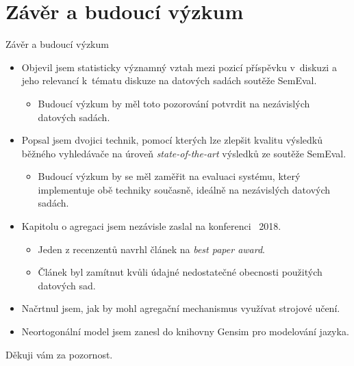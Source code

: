 \documentclass[aspectratio=169,t]{beamer}
\let\abbr\relax
\let\term\emph
\begin{document}

\section{Závěr a budoucí výzkum}
\begin{frame}[label=introduction]{Závěr a budoucí výzkum}
\begin{itemize}
  \item<1-> Objevil jsem \alert<1-2>{statisticky významný vztah mezi pozicí
    příspěvku} v~diskuzi \alert<1-2>{a jeho relevancí} k~tématu diskuze na
    datových sadách soutěže SemEval.
  \begin{itemize}
    \item<2-> Budoucí výzkum by měl toto pozorování potvrdit na
      \alert<2>{nezávislých datových sadách}.
  \end{itemize}
  \item<3-> Popsal jsem \alert<3-4>{dvojici technik}, pomocí kterých lze
    \alert<3-4>{zlepšit kvalitu výsledků} běžného vyhledávače \alert<3-4>{na
    úroveň \term{state-of-the-art}} výsledků ze soutěže SemEval.
  \begin{itemize}
    \item<4-> Budoucí výzkum by se měl zaměřit na evaluaci systému, který
      \alert<4>{implementuje obě techniky současně}, ideálně na nezávislých
      datových sadách.
  \end{itemize}
  \item<5-> Kapitolu o agregaci jsem nezávisle zaslal na konferenci \abbr{ECIR}~2018.
  \begin{itemize}
    \item<6-> Jeden z recenzentů \alert<6>{navrhl článek na \term{best paper award}}.
    \item<7-> Článek byl \alert<7>{zamítnut} kvůli údajné \alert<6-7>{nedostatečné
      obecnosti použitých datových sad}.
  \end{itemize}
  \item<8-> Načrtnul jsem, jak by mohl agregační mechanismus \alert<8>{využívat
    strojové učení}.
  \item<9-> Neortogonální model jsem \alert<9>{zanesl do knihovny Gensim pro
    modelování jazyka}.
\end{itemize}
\end{frame}

\begin{frame}[label=thanks, plain]
\vfill
\centerline{Děkuji vám za pozornost.}
\vfill
\end{frame}
\end{document}
